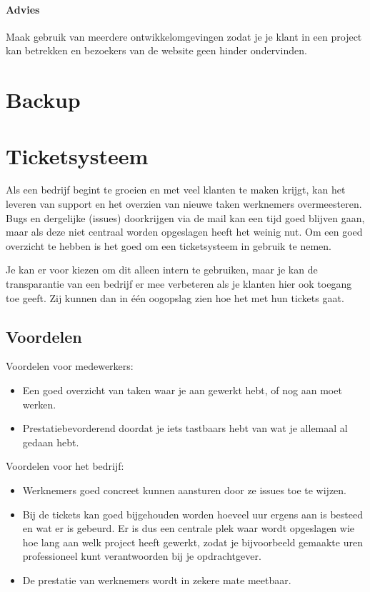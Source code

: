 \paragraph{Advies} Maak gebruik van meerdere ontwikkelomgevingen zodat je je klant in een project kan betrekken en bezoekers van de website geen hinder ondervinden.

\section{Backup}



\section{Ticketsysteem}

Als een bedrijf begint te groeien en met veel klanten te maken krijgt, kan het leveren van support en het overzien van nieuwe taken werknemers overmeesteren. Bugs en dergelijke (issues) doorkrijgen via de mail kan een tijd goed blijven gaan, maar als deze niet centraal worden opgeslagen heeft het weinig nut. Om een goed overzicht te hebben is het goed om een ticketsysteem in gebruik te nemen.

Je kan er voor kiezen om dit alleen intern te gebruiken, maar je kan de transparantie van een bedrijf er mee verbeteren als je klanten hier ook toegang toe geeft. Zij kunnen dan in \'{e}\'{e}n oogopslag zien hoe het met hun tickets gaat.

\subsection{Voordelen}

Voordelen voor medewerkers:

\begin{itemize}
  \item Een goed overzicht van taken waar je aan gewerkt hebt, of nog aan moet werken.
  \item Prestatiebevorderend doordat je iets tastbaars hebt van wat je allemaal al gedaan hebt.
\end{itemize}

Voordelen voor het bedrijf:

\begin{itemize}
  \item Werknemers goed concreet kunnen aansturen door ze issues toe te wijzen.
  \item Bij de tickets kan goed bijgehouden worden hoeveel uur ergens aan is besteed en wat er is gebeurd. Er is dus een centrale plek waar wordt opgeslagen wie hoe lang aan welk project heeft gewerkt, zodat je bijvoorbeeld gemaakte uren professioneel kunt verantwoorden bij je opdrachtgever.
  \item De prestatie van werknemers wordt in zekere mate meetbaar.
\end{itemize}

